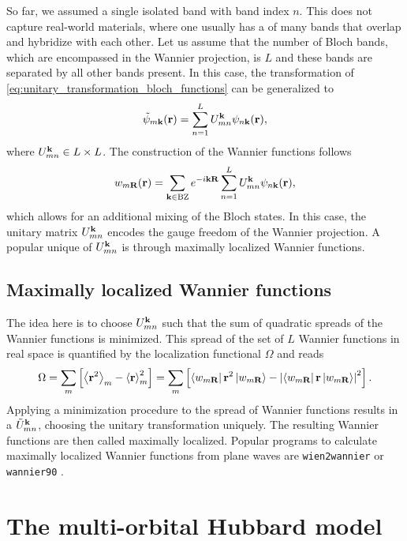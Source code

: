 \documentclass[../../main.tex]{subfiles}
\begin{document}
So far, we assumed a single isolated band with band index $n$. This does not capture real-world materials, where one usually has a  of many bands that overlap and hybridize with each other. Let us assume that the number of Bloch bands, which are encompassed in the Wannier projection, is $L$ and these bands are separated by all other bands present. In this case, the transformation of \eqref{eq:unitary_transformation_bloch_functions} can be generalized to
\begin{align}
		\tilde{\psi}_{m\textbf{k}}(\textbf{r})=\sum_{n=1}^{L}U_{mn}^{\textbf{k}}\psi_{n\textbf{k}}(\textbf{r}),
\end{align}
where $U_{mn}^{\textbf{k}}\in L\times L$. The construction of the Wannier functions follows
\begin{align}
	w_{m\textbf{R}}(\textbf{r})=\sum_{\textbf{k}\in\text{BZ}}e^{-i\textbf{kR}}\sum_{n=1}^{L}U_{mn}^{\textbf{k}}\psi_{n\textbf{k}}(\textbf{r}),
\end{align}
which allows for an additional mixing of the Bloch states. In this case, the unitary matrix $U_{mn}^{\textbf{k}}$ encodes the gauge freedom of the Wannier projection. A popular unique  of $U_{mn}^{\textbf{k}}$ is through maximally localized Wannier functions.

\subsection{Maximally localized Wannier functions}\label{sec:maximally_localized_wannier_functions}

The idea here is to choose $U_{mn}^{\textbf{k}}$ such that the sum of quadratic spreads of the Wannier functions is minimized. This spread of the set of $L$ Wannier functions in real space is quantified by the localization functional $\Omega$ and reads
\begin{align}
	\Omega=\sum_m \left [\left\langle \textbf{r}^2\right\rangle_m-\left\langle \textbf{r}\right\rangle^2_m\right ]=\sum_m \left [\bra{w_{m\textbf{R}}} \textbf{r}^2 \ket{w_{m\textbf{R}}}-\left |\bra{w_{m\textbf{R}}} \textbf{r} \ket{w_{m\textbf{R}}}\right |^2\right ].
\end{align}
Applying a minimization procedure to the spread of Wannier functions results in a  $\tilde U_{mn}^{\textbf{k}}$, choosing the unitary transformation uniquely. The resulting Wannier functions are then called maximally localized. Popular programs to calculate maximally localized Wannier functions from plane waves are \texttt{wien2wannier} \cite{Kunes2010} or \texttt{wannier90} \cite{Mostofi2008}.

\section{The multi-orbital Hubbard model}\label{sec:multi_orbital_hubbard}
\end{document}
